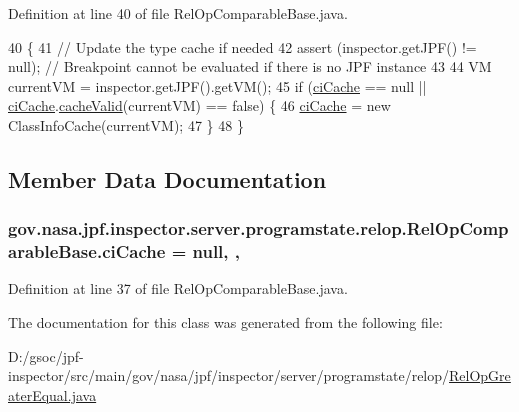 Definition at line 40 of file Rel\+Op\+Comparable\+Base.\+java.


\begin{DoxyCode}
40                                                                \{
41     \textcolor{comment}{// Update the type cache if needed}
42     assert (inspector.getJPF() != null); \textcolor{comment}{// Breakpoint cannot be evaluated if there is no JPF instance}
43 
44     VM currentVM = inspector.getJPF().getVM();
45     \textcolor{keywordflow}{if} (\hyperlink{classgov_1_1nasa_1_1jpf_1_1inspector_1_1server_1_1programstate_1_1relop_1_1_rel_op_comparable_base_a3bd22b88a44dff54d68b1d8a3e8f3d0a}{ciCache} == null || \hyperlink{classgov_1_1nasa_1_1jpf_1_1inspector_1_1server_1_1programstate_1_1relop_1_1_rel_op_comparable_base_a3bd22b88a44dff54d68b1d8a3e8f3d0a}{ciCache}.\hyperlink{classgov_1_1nasa_1_1jpf_1_1inspector_1_1utils_1_1_class_info_cache_ac71fb1624b72457166c1326d44fb50c5}{cacheValid}(currentVM) == \textcolor{keyword}{false}) \{
46       \hyperlink{classgov_1_1nasa_1_1jpf_1_1inspector_1_1server_1_1programstate_1_1relop_1_1_rel_op_comparable_base_a3bd22b88a44dff54d68b1d8a3e8f3d0a}{ciCache} = \textcolor{keyword}{new} ClassInfoCache(currentVM);
47     \}
48   \}
\end{DoxyCode}


\subsection{Member Data Documentation}
\subsubsection[{\texorpdfstring{ci\+Cache}{ciCache}}]{ gov.\+nasa.\+jpf.\+inspector.\+server.\+programstate.\+relop.\+Rel\+Op\+Comparable\+Base.\+ci\+Cache = null\hspace{0.3cm}{\ttfamily [static]}, {\ttfamily [protected]}, {\ttfamily [inherited]}}\hypertarget{classgov_1_1nasa_1_1jpf_1_1inspector_1_1server_1_1programstate_1_1relop_1_1_rel_op_comparable_base_a3bd22b88a44dff54d68b1d8a3e8f3d0a}{}\label{classgov_1_1nasa_1_1jpf_1_1inspector_1_1server_1_1programstate_1_1relop_1_1_rel_op_comparable_base_a3bd22b88a44dff54d68b1d8a3e8f3d0a}


Definition at line 37 of file Rel\+Op\+Comparable\+Base.\+java.



The documentation for this class was generated from the following file\+:\begin{DoxyCompactItemize}
\item 
D\+:/gsoc/jpf-\/inspector/src/main/gov/nasa/jpf/inspector/server/programstate/relop/\hyperlink{_rel_op_greater_equal_8java}{Rel\+Op\+Greater\+Equal.\+java}\end{DoxyCompactItemize}
